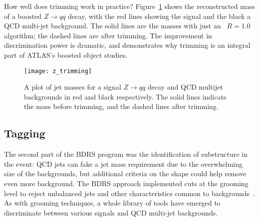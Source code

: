 
How well does trimming work in practice? Figure~\ref{fig:jets:z_trimming} shows the reconstructed mass of a boosted $Z\rightarrow qq$ decay, with the red lines showing the signal and the black a QCD multi-jet background. The solid lines are the masses with just an \antikt\ $R=1.0$ algorithm; the dashed lines are after trimming. The improvement in discrimination power is dramatic, and demonstrates why trimming is an integral part of ATLAS's boosted object studies.



\begin{figure}
\centering
\texttt{[image: z\_trimming]}
\label{fig:jets:z_trimming}
\caption{A plot of jet masses for a signal $Z\rightarrow qq$ decay and QCD multijet backgrounds in red and black respectively. The solid lines indicate the mass before trimming, and the dashed lines after trimming.}
\end{figure}



\subsection{Tagging}

The second part of the BDRS program was the identification of substructure in the event: QCD jets can fake a jet mass requirement due to the overwhelming size of the backgrounds, but additional criteria on the shape could help remove even more background. The BDRS approach implemented cuts at the grooming level to reject unbalanced jets and other characteristics common to backgrounds~\cite{BDRS}. As with grooming techniques, a whole library of tools have emerged to discriminate between various signals and QCD multi-jet backgrounds. 

